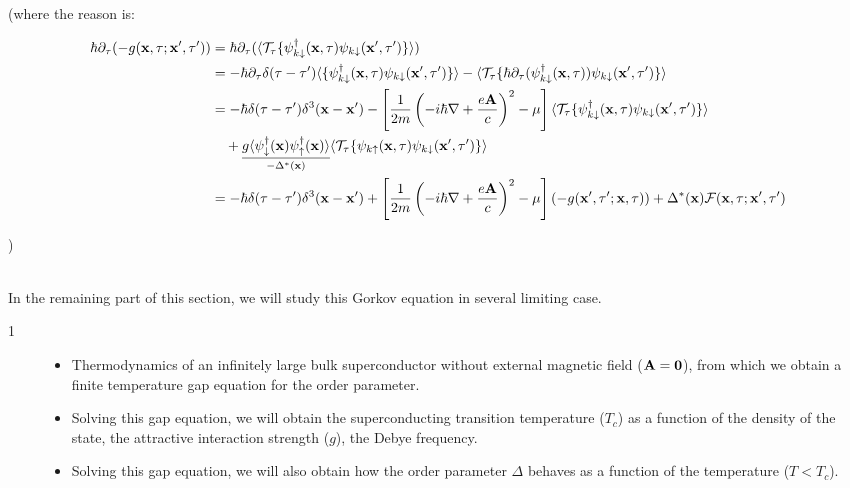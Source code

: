 (where the reason is:

\[\begin{split}
\hbar\partial_\tau(-g({\bf x},\tau;{\bf x'},\tau')) &= \hbar\partial_\tau(\langle\mathcal{T}_\tau\{\psi^\dagger_{k\downarrow}({\bf x},\tau)\psi_{k\downarrow}({\bf x'},\tau')\}\rangle)\\
&=-\hbar\partial_\tau\delta(\tau-\tau')\langle\{\psi^\dagger_{k\downarrow}({\bf x},\tau)\psi_{k\downarrow}({\bf x'},\tau')\}\rangle - \langle\mathcal{T}_\tau\{\hbar\partial_\tau(\psi^\dagger_{k\downarrow}({\bf x},\tau))\psi_{k\downarrow}({\bf x'},\tau')\}\rangle\\
&=-\hbar\delta(\tau-\tau')\delta^3({\bf x-x'}) - \left[\frac{1}{2m}\left(-i\hbar\nabla+\frac{e\bf A}{c}\right)^2-\mu\right]\langle\mathcal{T}_\tau\{\psi^\dagger_{k\downarrow}({\bf x},\tau)\psi_{k\downarrow}({\bf x'},\tau')\}\rangle\\
&\quad +\underset{-\Delta^*({\bf x})}{\underline{g\langle\psi_\downarrow^\dagger({\bf x})\psi_\uparrow^\dagger({\bf x})\rangle}}\langle\mathcal{T}_\tau\{\psi_{k\uparrow}({\bf x},\tau)\psi_{k\downarrow}({\bf x'},\tau')\}\rangle\\
&=-\hbar\delta(\tau-\tau')\delta^3({\bf x-x'})  + \left[\frac{1}{2m}\left(-i\hbar\nabla+\frac{e\bf A}{c}\right)^2-\mu\right](-g({\bf x'},\tau';{\bf x},\tau))+\Delta^*({\bf x})\mathcal{F}({\bf x},\tau;{\bf x'},\tau')
\end{split}\]

)\ \\

\ 

In the remaining part of this section, we will study this Gorkov equation in several limiting case.

\begin{description}
\item[1] \hfill
\begin{itemize}
\item Thermodynamics of an infinitely large bulk superconductor without external magnetic field ($\bf A=0$), from which we obtain a finite temperature gap equation for the order parameter. 
\item Solving this gap equation, we will obtain the superconducting transition temperature ($T_c$) as a function of the density of the state, the attractive interaction strength ($g$), the Debye frequency. 
\item Solving this gap equation, we will also obtain how the order parameter $\Delta$ behaves as a function of the temperature ($T<T_c$). 
\end{itemize}
\end{description}

